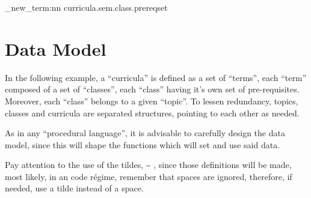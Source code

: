 \documentclass[10pt]{article}
\begin{document}

\begin{codestore}[currdef]
\NewDocumentCommand{\altdep}{}
  {
    \starray_new_term:nn {curricula.sem.class.prereqset}{}
  }
\end{codestore}



\section{Data Model}\label{DataModel}
In the following example, a ``curricula'' is defined as a set of ``terms'', each ``term'' composed of a set of ``classes'', each ``class'' having it's own set of pre-requisites. Moreover, each ``class'' belongs to a given ``topic''. To lessen redundancy, topics, classes and curricula are separated structures, pointing to each other as needed.

\begin{tsremark}
As in any ``procedural language'', it is advisable to  carefully design the data model, since this will shape the functions which will set and use said data.
\end{tsremark}

\begin{tsremark}
  Pay attention to the use of the tildes,  \~{} , since those definitions will be made, most likely, in an  code régime, remember that spaces are ignored, therefore, if needed, use a tilde instead of a space.
\end{tsremark}
\end{document}
